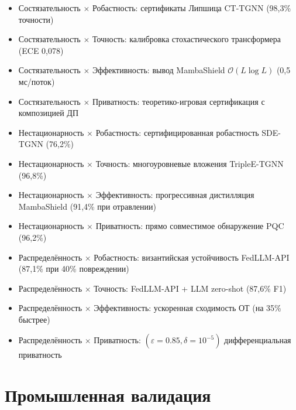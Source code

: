 \begin{itemize}
\item Состязательность $\times$ Робастность: сертификаты Липшица CT-TGNN (98,3\% точности)
\item Состязательность $\times$ Точность: калибровка стохастического трансформера (ECE 0,078)
\item Состязательность $\times$ Эффективность: вывод MambaShield $\mathcal{O}(L\log L)$ (0,5\,мс/поток)
\item Состязательность $\times$ Приватность: теоретико-игровая сертификация с композицией ДП
\item Нестационарность $\times$ Робастность: сертифицированная робастность SDE-TGNN (76,2\%)
\item Нестационарность $\times$ Точность: многоуровневые вложения TripleE-TGNN (96,8\%)
\item Нестационарность $\times$ Эффективность: прогрессивная дистилляция MambaShield (91,4\% при отравлении)
\item Нестационарность $\times$ Приватность: прямо совместимое обнаружение PQC (96,2\%)
\item Распределённость $\times$ Робастность: византийская устойчивость FedLLM-API (87,1\% при 40\% повреждении)
\item Распределённость $\times$ Точность: FedLLM-API + LLM zero-shot (87,6\% F1)
\item Распределённость $\times$ Эффективность: ускоренная сходимость ОТ (на 35\% быстрее)
\item Распределённость $\times$ Приватность: $(\varepsilon{=}0.85,\delta{=}10^{-5})$ дифференциальная приватность
\end{itemize}

\section*{Промышленная валидация}

